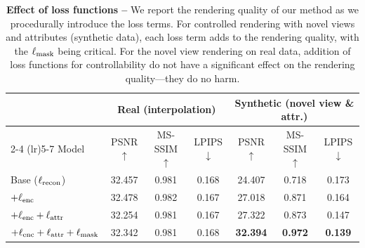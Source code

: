\begin{table}
  \centering
  \normalsize
  \setlength{\tabcolsep}{2pt}
  \begin{tabular}{@{}lccc ccc@{}}
    \toprule
                                              & \multicolumn{3}{c}{Real (interpolation)} & \multicolumn{3}{c}{Synthetic (novel view \& attr.)}                                               \\
    \cmidrule(lr){2-4}
    \cmidrule(lr){5-7}
    Model                                     & PSNR $\uparrow$                          & MS-SSIM $\uparrow$                                  & LPIPS $\downarrow$ & PSNR
    $\uparrow$                                & MS-SSIM $\uparrow$                       & LPIPS $\downarrow$                                                                                \\ \midrule Base
    ($\ell_{\text{recon}}$)                          & 32.457                                   & 0.981                                               & 0.168              & 24.407 & 0.718 & 0.173 \\
    $+\ell_{\text{enc}}$                             & 32.478                                   & 0.982                                               & 0.167              & 27.018 & 0.871 & 0.164 \\ $+
    \ell_{\text{enc}} +\ell_{\text{attr}}$                  & 32.254                                   & 0.981                                               & 0.167              & 27.322 & 0.873 & 0.147 \\
    $+ \ell_{\text{enc}} + \ell_{\text{attr}} +\ell_{\text{mask}}$ & 32.342                                   & 0.981                                               & 0.168              &
    \textbf{32.394}                           & \textbf{0.972}                           & \textbf{0.139}                                                                                    \\ \bottomrule\end{tabular}
  \caption[Effect of loss functions applied in \conerf]{ \textbf{{Effect of loss
          functions --}} We report the rendering quality of our method as we
    procedurally introduce the loss terms.
    For controlled rendering with novel views and attributes (synthetic data),
    each loss term adds to the rendering quality, with the $\ell_{\text{mask}}$ being
    critical.
    For the novel view rendering on real data, addition of loss functions for
    controllability do not have a significant effect on the rendering
    quality---they do no harm.
  } %
  \label{tab:conerf-ablations}
\end{table}